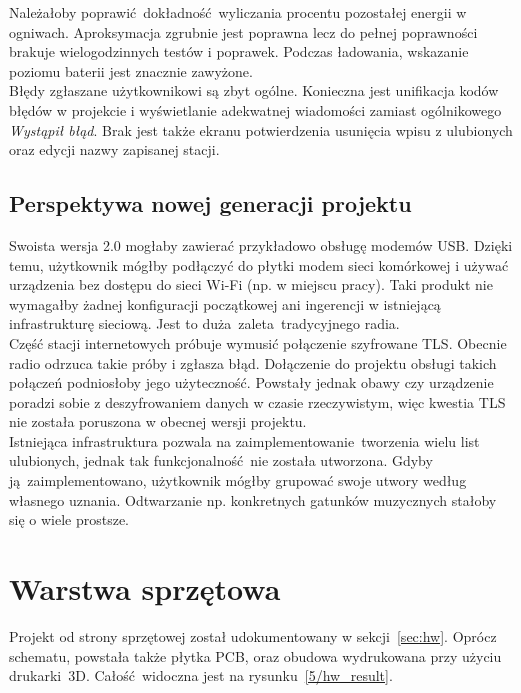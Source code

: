 \documentclass[polish]{aghengthesis}
\begin{document}
			Należałoby poprawić dokładność wyliczania procentu pozostałej energii w ogniwach. Aproksymacja zgrubnie jest poprawna lecz do pełnej poprawności brakuje wielogodzinnych testów i poprawek. Podczas ładowania, wskazanie poziomu baterii jest znacznie zawyżone.
			$ $\\
			
			Błędy zgłaszane użytkownikowi są zbyt ogólne. Konieczna jest unifikacja kodów błędów w projekcie i wyświetlanie adekwatnej wiadomości zamiast ogólnikowego \textit{Wystąpił błąd}. Brak jest także ekranu potwierdzenia usunięcia wpisu z ulubionych oraz edycji nazwy zapisanej stacji.
		
		\subsection{Perspektywa nowej generacji projektu}
			Swoista wersja 2.0 mogłaby zawierać przykładowo obsługę modemów USB. Dzięki temu, użytkownik mógłby podłączyć do płytki modem sieci komórkowej i używać urządzenia bez dostępu do sieci Wi-Fi (np. w miejscu pracy). Taki produkt nie wymagałby żadnej konfiguracji początkowej ani ingerencji w istniejącą infrastrukturę sieciową. Jest to duża zaleta tradycyjnego radia.
			$ $\\
			
			Część stacji internetowych próbuje wymusić połączenie szyfrowane TLS. Obecnie radio odrzuca takie próby i zgłasza błąd. Dołączenie do projektu obsługi takich połączeń podniosłoby jego użyteczność. Powstały jednak obawy czy urządzenie poradzi sobie z deszyfrowaniem danych w czasie rzeczywistym, więc kwestia TLS nie została poruszona w obecnej wersji projektu.
			$ $\\
			
			Istniejąca infrastruktura pozwala na zaimplementowanie tworzenia wielu list ulubionych, jednak tak funkcjonalność nie została utworzona. Gdyby ją zaimplementowano, użytkownik mógłby grupować swoje utwory według własnego uznania. Odtwarzanie np. konkretnych gatunków muzycznych stałoby się o wiele prostsze.
			
	\section{Warstwa sprzętowa}
		Projekt od strony sprzętowej został udokumentowany w sekcji~\ref{sec:hw}. Oprócz schematu, powstała także płytka PCB, oraz obudowa wydrukowana przy użyciu drukarki~3D. Całość widoczna jest na rysunku~\ref{5/hw_result}.
		
\end{document}
